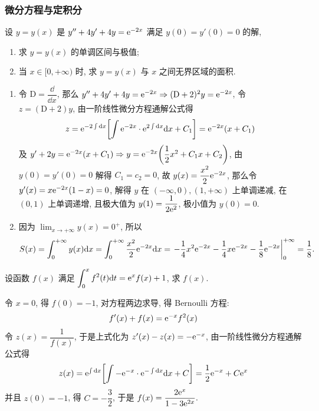 \subsubsection{微分方程与定积分}

\begin{example}
    设 $y=y(x)$ 是 $y''+4y'+4y=\mathrm{e} ^{-2x}$ 满足 $y(0)=y'(0)=0$ 的解,
    \begin{enumerate}[label=(\arabic{*})]
        \item 求 $y=y(x)$ 的单调区间与极值;
        \item 当 $x\in[0,+\infty)$ 时, 求 $y=y(x)$ 与 $x$ 之间无界区域的面积.
    \end{enumerate}
\end{example}
\begin{solution}
    \begin{enumerate}[label=(\arabic{*})]
        \item 令 $\mathrm{D}=\dfrac{\dd}{\dd x}$, 那么 $y''+4y'+4y=\mathrm{e} ^{-2x}\Rightarrow(\mathrm{D}+2)^2y=\mathrm{e} ^{-2x}$, 令 $z=(\mathrm{D}+2)y$, 由一阶线性微分方程通解公式得 $$z=\mathrm{e} ^{-2\int \dd x}\qty[\int \mathrm{e} ^{-2x}\cdot \mathrm{e} ^{2\int \dd x}\dd x+C_1]=\mathrm{e} ^{-2x}\qty(x+C_1)$$
        及 $y'+2y=\mathrm{e} ^{-2x}\qty(x+C_1)\Rightarrow y=\mathrm{e} ^{-2x}\qty(\dfrac{1}{2}x^2+C_1 x+C_2)$, 由 $y(0)=y'(0)=0$ 解得 $C_1=c_2=0$, 故 $y(x)=\dfrac{x^2}{2}\mathrm{e} ^{-2x}$, 那么令 $y'(x)=x\mathrm{e} ^{-2x}(1-x)=0$, 解得 $y$ 在 $(-\infty,0),(1,+\infty)$ 上单调递减, 在 $(0,1)$ 上单调递增, 且极大值为 $y(1)=\dfrac{1}{2\mathrm{e} ^{2}}$, 极小值为 $y(0)=0.$
        \item 因为 $ \displaystyle \lim_{x \to +\infty} y(x)=0^+$, 所以 
        $$
        S(x)=\int_{0}^{+\infty} y(x) \dd x=\int_{0}^{+\infty} \dfrac{x^2}{2}\e ^{-2x} \dd x=\eval{-\dfrac{1}{4}x^2 \e ^{-2x}-\dfrac{1}{4}x \e ^{-2x}-\dfrac{1}{8}\e ^{-2x}}_{0}^{+\infty}=\dfrac{1}{8}.
        $$
    \end{enumerate}
\end{solution}

\begin{example}[2023 四川大学]
    设函数 $f(x)$ 满足 $\displaystyle\int_{0}^{x}f^2(t)\dd t=\mathrm{e} ^xf(x)+1$, 求 $f(x).$
\end{example}
\begin{solution}
    令 $x=0$, 得 $f(0)=-1$, 对方程两边求导, 得 Bernoulli 方程:
    $$f'(x)+f(x)=\mathrm{e} ^{-x}f^2(x)$$
    令 $z(x)=\dfrac{1}{f(x)}$, 于是上式化为 $z'(x)-z(x)=-\mathrm{e} ^{-x}$, 由一阶线性微分方程通解公式得
    $$z(x)=\mathrm{e} ^{\int\dd x}\qty[\int-\mathrm{e} ^{-x}\cdot\mathrm{e} ^{-\int\dd x}\dd x+C]=\dfrac{1}{2}\mathrm{e} ^{-x}+C\mathrm{e} ^x$$
    并且 $z(0)=-1$, 得 $C=-\dfrac{3}{2}$, 于是 $f(x)=\dfrac{2\mathrm{e} ^{x}}{1-3\mathrm{e} ^{2x}}.$
\end{solution}

